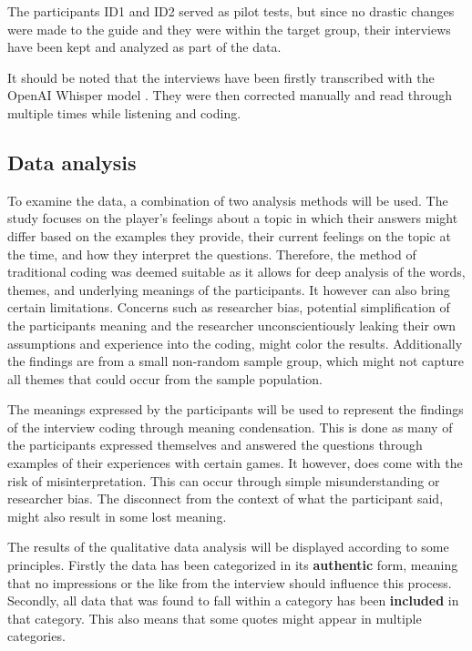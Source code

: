 The participants ID1 and ID2 served as pilot tests, but since no drastic changes were made to the guide and they were within the target group, their interviews have been kept and analyzed as part of the data.

It should be noted that the interviews have been firstly transcribed with the OpenAI Whisper model \cite{noauthor_openai_nodate}. They were then corrected manually and read through multiple times while listening and coding.

\subsection{Data analysis}
To examine the data, a combination of two analysis methods will be used. The study focuses on the player's feelings about a topic in which their answers might differ based on the examples they provide, their current feelings on the topic at the time, and how they interpret the questions. Therefore, the method of traditional coding was deemed suitable as it allows for deep analysis of the words, themes, and underlying meanings of the participants. It however can also bring certain limitations. Concerns such as researcher bias, potential simplification of the participants meaning and the researcher unconscientiously leaking their own assumptions and experience into the coding, might color the results. Additionally the findings are from a small non-random sample group, which might not capture all themes that could occur from the sample population.

The meanings expressed by the participants will be used to represent the findings of the interview coding through meaning condensation. This is done as many of the participants expressed themselves and answered the questions through examples of their experiences with certain games. It however, does come with the risk of misinterpretation. This can occur through simple misunderstanding or researcher bias. The disconnect from the context of what the participant said, might also result in some lost meaning. 

The results of the qualitative data analysis will be displayed according to some principles. Firstly the data has been categorized in its \textbf{authentic} form, meaning that no impressions or the like from the interview should influence this process. Secondly, all data that was found to fall within a category has been \textbf{included} in that category. This also means that some quotes might appear in multiple categories. 

